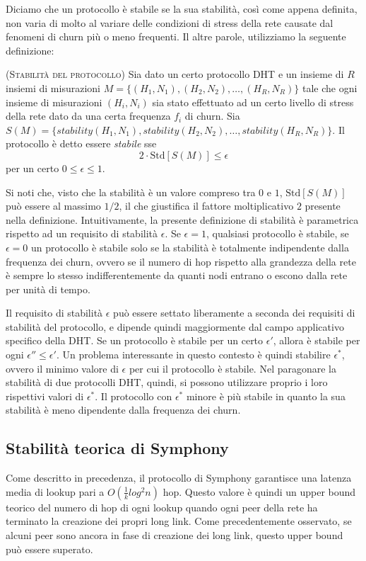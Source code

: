 \documentclass[prodmode,acmtap]{acmlarge}
\begin{document}
Diciamo che un protocollo è stabile se la sua stabilità, così come appena definita, non varia di molto al variare delle condizioni di stress della rete causate dal fenomeni di churn più o meno frequenti. Il altre parole, utilizziamo la seguente definizione:

\begin{definition}{(\textsc{Stabilità del protocollo})}
Sia dato un certo protocollo DHT e un insieme di $R$ insiemi di misurazioni $M=\{ (H_1,N_1), (H_2,N_2), \dots, (H_R,N_R) \}$ tale che ogni insieme di misurazioni $(H_i,N_i)$ sia stato effettuato ad un certo livello di stress della rete dato da una certa frequenza $f_i$ di churn. Sia $S(M) = \{ stability(H_1,N_1), stability(H_2,N_2), \dots, stability(H_R,N_R) \}$. Il protocollo è detto essere \emph{stabile} sse
$$ 2 \cdot \mathrm{Std}[S(M)] \leq \epsilon $$
per un certo $0 \le \epsilon \le 1$.
\end{definition}

Si noti che, visto che la stabilità è un valore compreso tra $0$ e $1$, $\mathrm{Std}[S(M)]$ può essere al massimo $1/2$, il che giustifica il fattore moltiplicativo $2$ presente nella definizione. Intuitivamente, la presente definizione di stabilità è parametrica rispetto ad un requisito di stabilità $\epsilon$. Se $\epsilon=1$, qualsiasi protocollo è stabile, se $\epsilon=0$ un protocollo è stabile solo se la stabilità è totalmente indipendente dalla frequenza dei churn, ovvero se il numero di hop rispetto alla grandezza della rete è sempre lo stesso indifferentemente da quanti nodi entrano o escono dalla rete per unità di tempo.

Il requisito di stabilità $\epsilon$ può essere settato liberamente a seconda dei requisiti di stabilità del protocollo, e dipende quindi maggiormente dal campo applicativo specifico della DHT. Se un protocollo è stabile per un certo $\epsilon'$, allora è stabile per ogni $\epsilon'' \le \epsilon'$. Un problema interessante in questo contesto è quindi stabilire $\epsilon^*$, ovvero il minimo valore di $\epsilon$ per cui il protocollo è stabile. Nel paragonare la stabilità di due protocolli DHT, quindi, si possono utilizzare proprio i loro rispettivi valori di $\epsilon^*$. Il protocollo con $\epsilon^*$ minore è più stabile in quanto la sua stabilità è meno dipendente dalla frequenza dei churn.


\subsection{Stabilità teorica di Symphony} \label{stab-teorica}
Come descritto in precedenza, il protocollo di Symphony garantisce una latenza media di lookup pari a $O(\frac{1}{k}log^2n)$ hop. Questo valore è quindi un upper bound teorico del numero di hop di ogni lookup quando ogni peer della rete ha terminato la creazione dei propri long link. Come precedentemente osservato, se alcuni peer sono ancora in fase di creazione dei long link, questo upper bound può essere superato.
\end{document}
